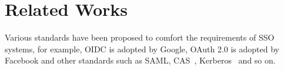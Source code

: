 \section{Related Works}%
\label{sec:related}
Various standards have been proposed to comfort the requirements of SSO systems, for example, OIDC is adopted by Google, OAuth 2.0 is adopted by Facebook and other standards such as SAML, CAS~\cite{aubry2004esup}, Kerberos~\cite{Kerberos} and so on.


